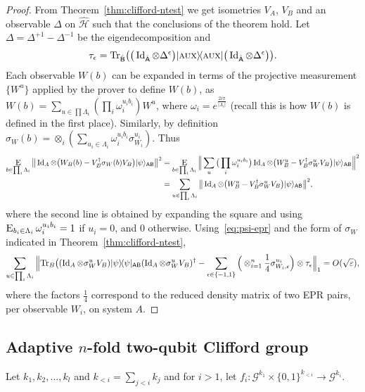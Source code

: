 \documentclass[11pt]{article}
\theoremstyle{remark}
\theoremstyle{definition}
\newcommand{\ket}[1]{|#1\rangle}
\newcommand{\bra}[1]{\langle#1|}
\newcommand{\proj}[1]{\ket{#1}\!\bra{#1}}
\newcommand{\Tr}{\mbox{\rm Tr}}
\newcommand{\Id}{\ensuremath{\mathop{\rm Id}\nolimits}}
\newcommand{\Es}[1]{\ensuremath{\mathop{\textsc{E}}_{#1}}}
\newcommand{\reg}[1]{{\textsf{#1}}}
\newcommand{\mH}{\mathcal{H}}
\newcommand{\eps}{\varepsilon}
\newcommand{\aux}{\textsc {aux}}
\begin{document}
\begin{proof}
From Theorem~\ref{thm:clifford-ntest} we get isometries $V_A$, $V_B$ and an observable $\Delta$ on $\hat{\mH}$ such that the conclusions of the theorem hold. Let $\Delta = \Delta^{+1}-\Delta^{-1}$ be the eigendecomposition and 
$$\tau_{\epsilon} = \Tr_{\hat{\reg{B}}}\big( \big(\Id_{\hat{\reg{A}}}\otimes \Delta^\epsilon \big)\proj{\aux}\big(\Id_{\hat{\reg{A}}}\otimes \Delta^\epsilon\big)\big).$$
Each observable $W(b)$  can be expanded in terms of the projective measurement $\{W^u\}$ applied by the prover to define $W(b)$, as $W(b) = \sum_{u\in \prod \Lambda_i} (\prod_i \omega_i^{u_ib_i}) W^u$, where $\omega_i = e^{\frac{2i\pi}{|\Lambda_i|}}$ (recall this is how $W(b)$ is defined in the first place). Similarly, by definition $\sigma_W(b) = \otimes_i (\sum_{u_i\in\Lambda_i} \omega_i^{u_ib_i} \sigma_{W_i}^{u_i})$. Thus
\begin{align*}
\Es{b\in\prod_i \Lambda_i}\big\| \Id_A \otimes \big(  W_B(b) - V_B^\dagger \sigma_{W}(b) V_B\big)   \ket{\psi}_{\reg{AB}} \big\|^2
&= \Es{b\in\prod_i \Lambda_i}\Big\| \sum_u \big( \prod_i \omega_i^{u_ib_i}\big) \Id_A \otimes \big(  W_B^u - V_B^\dagger\sigma_{W}^u V_B\big)   \ket{\psi}_{\reg{AB}} \Big\|^2    \\
&= \sum_{u\in\prod_i \Lambda_i}\big\|  \Id_A \otimes \big(  W_B^u - V_B^\dagger\sigma_{W}^u V_B\big)   \ket{\psi}_{\reg{AB}} \big\|^2,       
\end{align*}
where the second line is obtained by expanding the square and using $\Es{b_i\in\Lambda_i} \omega_i^{u_ib_i} = 1$ if $u_i=0$, and $0$ otherwise. 
Using~\eqref{eq:psi-epr} and the form of $\sigma_W$ indicated in Theorem~\ref{thm:clifford-ntest},
\begin{align*}
    \sum_{u\in\prod_i \Lambda_i}\Big\|  \Tr_B \big( (\Id_A \otimes \sigma_{W}^u V_B)   \proj{\psi}_{\reg{AB}} (\Id_A \otimes \sigma_{W}^u V_B)^\dagger - \sum_{\epsilon\in\{-1,1\}} \Big( \otimes_{i=1}^n \frac{1}{4}\sigma_{W_i,\epsilon}^{u_i}\Big)\otimes \tau_\epsilon   \Big\|_1 = O(\sqrt{\eps}),
\end{align*}
where the factors $\frac{1}{4}$ correspond to the reduced density matrix of two EPR pairs, per observable $W_i$, on system $A$. 
\end{proof}





\subsection{Adaptive $n$-fold two-qubit Clifford group}
  Let $k_1, k_2, ..., k_l$ and $k_{< i} = \sum_{j < i} k_j$ and for $i > 1$, let $f_{i} :
  \mathcal{G}^{k_{1}} \times \{0,1\}^{k_{<i}}
  \rightarrow \mathcal{G}^{k_i}$. 
\end{document}
